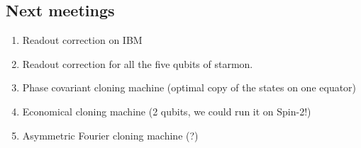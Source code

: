\documentclass[11pt]{article}
\begin{document}
\subsection{Next meetings}
\begin{enumerate}
    \item Readout correction on IBM
    \item Readout correction for all the five qubits of starmon.
    \item Phase covariant cloning machine (optimal copy of the states on one equator)
    \item Economical cloning machine (2 qubits, we could run it on Spin-2!)
    \item Asymmetric Fourier cloning machine (?)
\end{enumerate}
\end{document}
